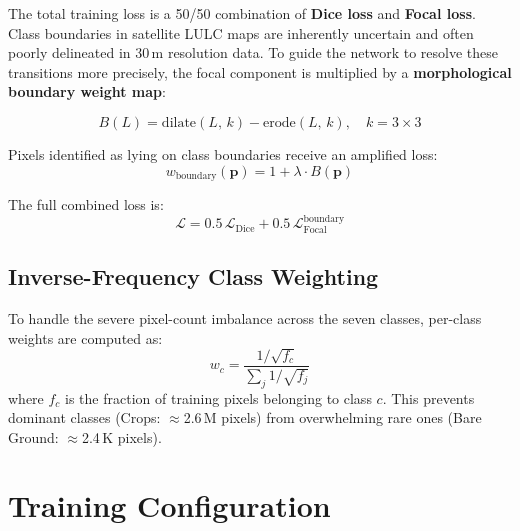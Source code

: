 \documentclass[12pt,a4paper]{article}
\begin{document}
The total training loss is a 50/50 combination of \textbf{Dice loss} and
\textbf{Focal loss}. Class boundaries in satellite LULC maps are
inherently uncertain and often poorly delineated in 30\,m resolution data.
To guide the network to resolve these transitions more precisely, the
focal component is multiplied by a \textbf{morphological boundary weight
map}:

\begin{equation}
  B(L) = \text{dilate}(L,\,k) - \text{erode}(L,\,k), \quad k = 3\times3
\end{equation}

Pixels identified as lying on class boundaries receive an amplified loss:
\begin{equation}
  w_\text{boundary}(\mathbf{p}) = 1 + \lambda \cdot B(\mathbf{p})
\end{equation}

The full combined loss is:
\begin{equation}
  \mathcal{L} = 0.5\,\mathcal{L}_\text{Dice} + 0.5\,\mathcal{L}_\text{Focal}^\text{boundary}
\end{equation}

\subsection{Inverse-Frequency Class Weighting}

To handle the severe pixel-count imbalance across the seven classes,
per-class weights are computed as:
\begin{equation}
  w_c = \frac{1/\sqrt{f_c}}{\sum_j 1/\sqrt{f_j}}
\end{equation}
where $f_c$ is the fraction of training pixels belonging to class $c$.
This prevents dominant classes (Crops: $\approx$2.6\,M pixels) from
overwhelming rare ones (Bare Ground: $\approx$2.4\,K pixels).

\section{Training Configuration}
\end{document}
